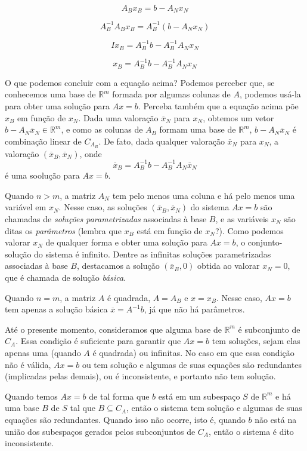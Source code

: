 \documentclass[]{article}
\numberwithin{equation}{section}
\begin{document}
$$
A_B x_B = b - A_N x_N
$$

$$
A_B^{-1} A_B x_B = A_B^{-1} (b - A_N x_N)
$$

$$
I x_B = A_B^{-1} b - A_B^{-1} A_N x_N
$$

$$
x_B = A_B^{-1} b - A_B^{-1} A_N x_N
$$

O que podemos concluir com a equação acima? Podemos perceber que, se conhecemos uma base de $\mathbb{R}^m$ formada por algumas colunas de $A$, podemos usá-la para obter uma solução para $Ax = b$. Perceba também que a equação acima põe $x_B$ em função de $x_N$. Dada uma valoração $\overline{x}_N$ para $x_N$, obtemos um vetor $b - A_N \overline{x}_N \in \mathbb{R}^m$, e como as colunas de $A_B$ formam uma base de $\mathbb{R}^m$, $b - A_N \overline{x}_N$ é combinação linear de $C_{A_B}$. De fato, dada qualquer valoração $\overline{x}_N$ para $x_N$, a valoração $(\overline{x}_B, \overline{x}_N)$, onde
$$
\overline{x}_B = A_B^{-1} b - A_B^{-1} A_N \overline{x}_N
$$
é uma soolução para $Ax = b$.

Quando $n > m$, a matriz $A_N$ tem pelo menos uma coluna e há pelo menos uma variável em $x_N$. Nesse caso, as soluções  $(\overline{x}_B, \overline{x}_N)$ do sistema $Ax = b$ são chamadas de \emph{soluções parametrizadas} associadas à base $B$, e as variáveis $x_N$ são ditas os \emph{parâmetros} (lembra que $x_B$ está em função de $x_N$?). Como podemos valorar $x_N$ de qualquer forma e obter uma solução para $Ax = b$, o conjunto-solução do sistema é infinito. Dentre as infinitas soluções parametrizadas associadas à base $B$, destacamos a solução $(\overline{x}_B, 0)$ obtida ao valorar $x_N = 0$, que é chamada de solução \emph{básica}.

Quando $n = m$, a matriz $A$ é quadrada, $A = A_B$ e $x = x_B$. Nesse caso, $Ax = b$ tem apenas a solução básica $\overline{x} = A^{-1} b$, já que não há parâmetros.

Até o presente momento, consideramos que alguma base de $\mathbb{R}^m$ é subconjunto de $C_A$. Essa condição é suficiente para garantir que $Ax = b$ tem soluções, sejam elas apenas uma (quando $A$ é quadrada) ou infinitas. No caso em que essa condição não é válida, $Ax = b$ ou tem solução e algumas de suas equações são redundantes (implicadas pelas demais), ou é inconsistente, e portanto não tem solução.

Quando temos $Ax = b$ de tal forma que $b$ está em um subespaço $S$ de $\mathbb{R}^m$ e há uma base $B$ de $S$ tal que $B \subseteq C_A$, então o sistema tem solução e algumas de suas equações são redundantes. Quando isso não ocorre, isto é, quando $b$ não está na união dos subespaços gerados pelos subconjuntos de $C_A$, então o sistema é dito inconsistente.
\end{document}
